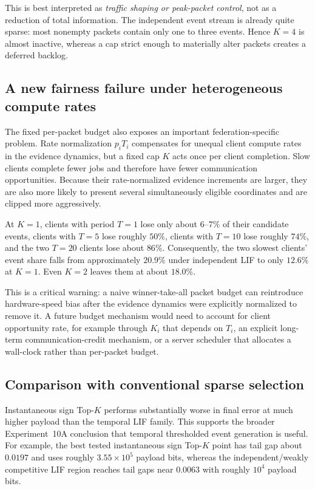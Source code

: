 This is best interpreted as \emph{traffic shaping or peak-packet control}, not as a reduction of total information. The independent event stream is already quite sparse: most nonempty packets contain only one to three events. Hence $K=4$ is almost inactive, whereas a cap strict enough to materially alter packets creates a deferred backlog.

\subsection{A new fairness failure under heterogeneous compute rates}

The fixed per-packet budget also exposes an important federation-specific problem. Rate normalization $p_iT_i$ compensates for unequal client compute rates in the evidence dynamics, but a fixed cap $K$ acts once per client completion. Slow clients complete fewer jobs and therefore have fewer communication opportunities. Because their rate-normalized evidence increments are larger, they are also more likely to present several simultaneously eligible coordinates and are clipped more aggressively.

At $K=1$, clients with period $T=1$ lose only about $6$--$7\%$ of their candidate events, clients with $T=5$ lose roughly $50\%$, clients with $T=10$ lose roughly $74\%$, and the two $T=20$ clients lose about $86\%$. Consequently, the two slowest clients' event share falls from approximately $20.9\%$ under independent LIF to only $12.6\%$ at $K=1$. Even $K=2$ leaves them at about $18.0\%$.

This is a critical warning: a naive winner-take-all packet budget can reintroduce hardware-speed bias after the evidence dynamics were explicitly normalized to remove it. A future budget mechanism would need to account for client opportunity rate, for example through $K_i$ that depends on $T_i$, an explicit long-term communication-credit mechanism, or a server scheduler that allocates a wall-clock rather than per-packet budget.

\subsection{Comparison with conventional sparse selection}

Instantaneous sign Top-$K$ performs substantially worse in final error at much higher payload than the temporal LIF family. This supports the broader Experiment~10A conclusion that temporal thresholded event generation is useful. For example, the best tested instantaneous sign Top-$K$ point has tail gap about $0.0197$ and uses roughly $3.55\times10^5$ payload bits, whereas the independent/weakly competitive LIF region reaches tail gaps near $0.0063$ with roughly $10^4$ payload bits.

